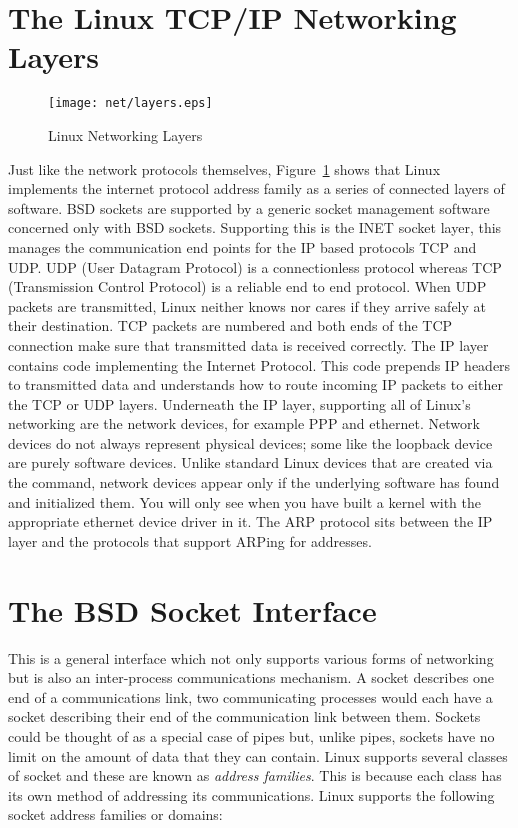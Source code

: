 \section{The Linux TCP/IP Networking Layers}
\begin{figure}
\begin{center}
{\centering \texttt{[image: net/layers.eps]} \par}
\end{center}
\caption{Linux Networking Layers}
\label{layers-figure}
\end{figure}
Just like the network protocols themselves, 
Figure~\ref{layers-figure} shows that Linux implements the internet protocol address family
as a series of connected layers of software.
BSD sockets are supported by a generic socket management software concerned only with BSD sockets.
Supporting this is the INET socket layer, this 
manages the communication end points for the IP based protocols TCP and UDP.
UDP (User Datagram Protocol) is a connectionless protocol whereas TCP (Transmission Control Protocol) is a 
reliable end to end protocol.
When UDP packets are transmitted, Linux neither knows nor cares if they arrive safely at their destination.
TCP packets are numbered and both ends of the TCP connection make sure that transmitted data is received
correctly.
The IP layer contains code implementing the Internet Protocol.
This code prepends IP headers to transmitted data and understands how to route incoming IP packets to either
the TCP or UDP layers.
Underneath the IP layer, supporting all of Linux's networking are the network devices, for example PPP
and ethernet.
Network devices do not always represent physical devices; some like the loopback device are purely
software devices.
Unlike standard Linux devices that are created via the 
command, network devices appear only if the underlying software has found and initialized them.
You will only see  when you have built a kernel with the appropriate ethernet device driver 
in it.
The ARP protocol sits between the IP layer and the protocols that support ARPing for addresses.

\section{The BSD Socket Interface}
This is a general interface which not only supports various forms of networking but is also an
inter-process communications mechanism.
A socket describes one end of a communications link, two communicating processes would each have
a socket describing their end of the communication link between them.
Sockets could be thought of as a special case of pipes but, unlike pipes, sockets have no limit
on the amount of data that they can contain.
Linux supports several classes of socket and these are known as {\em address families}.
This is because each class has its own method of addressing its communications.
Linux supports the following socket address families or domains:

